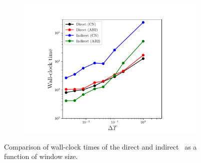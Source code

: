 \begin{figure}
\begin{center}
\begin{subfigure}[t]{0.45\textwidth}
\includegraphics[width=1.\linewidth]{figs/sod/walltime_vs_window.pdf}
\label{fig:sod_error_a}
\end{subfigure}
\caption{Comparison of wall-clock times of the direct and indirect \methodAcronymROMs\ as a function of window size.} 
\label{fig:sod_walltime}
\end{center}
\end{figure}

